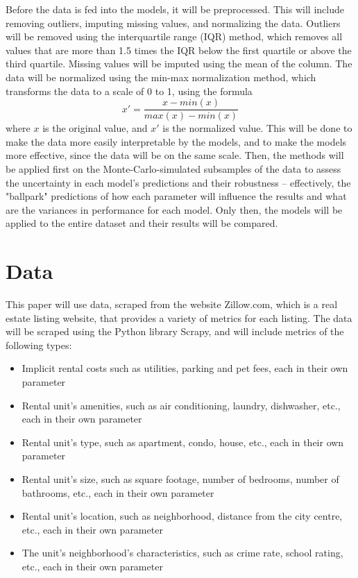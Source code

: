 \documentclass[12pt]{report}
\begin{document}
Before the data is fed into the models, it will be preprocessed. This will include removing outliers, imputing missing values, and normalizing the data. Outliers will be removed using the interquartile range (IQR) method, which removes all values that are more than 1.5 times the IQR below the first quartile or above the third quartile. Missing values will be imputed using the mean of the column. The data will be normalized using the min-max normalization method, which transforms the data to a scale of 0 to 1, using the formula
\begin{equation}
x' = \frac{x - min(x)}{max(x) - min(x)}
\end{equation}
where $x$ is the original value, and $x'$ is the normalized value. This will be done to make the data more easily interpretable by the models, and to make the models more effective, since the data will be on the same scale. Then, the methods will be applied first on the Monte-Carlo-simulated subsamples of the data to assess the uncertainty in each model's predictions and their robustness -- effectively, the "ballpark" predictions of how each parameter will influence the results and what are the variances in performance for each model. Only then, the models will be applied to the entire dataset and their results will be compared. 

\section{Data}
This paper will use data, scraped from the website Zillow.com, which is a real estate listing website, that provides a variety of metrics for each listing. The data will be scraped using the Python library Scrapy, and will include metrics of the following types:
\begin{itemize}
\item Implicit rental costs such as utilities, parking and pet fees, each in their own parameter
\item Rental unit's amenities, such as air conditioning, laundry, dishwasher, etc., each in their own parameter
\item Rental unit's type, such as apartment, condo, house, etc., each in their own parameter
\item Rental unit's size, such as square footage, number of bedrooms, number of bathrooms, etc., each in their own parameter
\item Rental unit's location, such as neighborhood, distance from the city centre, etc., each in their own parameter
\item The unit's neighborhood's characteristics, such as crime rate, school rating, etc., each in their own parameter
\end{itemize}
\end{document}
